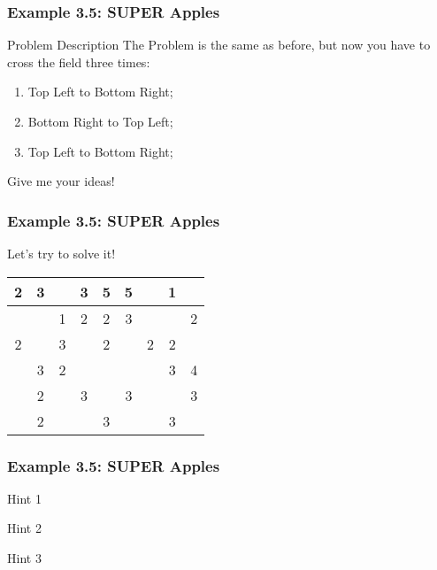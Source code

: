 \documentclass{beamer}
\begin{document}
\begin{frame}
  \frametitle{Example 3.5: SUPER Apples}
  \begin{block}{Problem Description}
    The Problem is the same as before, but now you have to cross the
    field three times:
    \begin{enumerate}
      \item Top Left to Bottom Right;
      \item Bottom Right to Top Left;
      \item Top Left to Bottom Right;
    \end{enumerate}
  \end{block}
  \medskip
  \begin{center}
    Give me your ideas!
  \end{center}
\end{frame}

\begin{frame}
  \frametitle{Example 3.5: SUPER Apples}
  \begin{block}{}
    Let's try to solve it!
  \end{block}
  \begin{center}
    \begin{tabular}{|c|c|c|c|c|c|c|c|c|}
      \hline
      2 & 3 & & 3 & 5 & 5 & & 1 & \\
      \hline
      & & 1 & 2 & 2 & 3 & & & 2 \\
      \hline
    2 & & 3 & & 2 & & 2 & 2 & \\
    \hline
    & 3 & 2 & & & & & 3 & 4 \\
    \hline
    & 2 & & 3 & & 3 & & & 3\\
    \hline
    & 2 & & & 3 & & & 3 & \\
    \hline      
    \end{tabular}
  \end{center}
\end{frame}

\begin{frame}
  \frametitle{Example 3.5: SUPER Apples}
  \begin{block}{Hint 1}
  \end{block}

  \begin{block}{Hint 2}
  \end{block}
  
  \begin{block}{Hint 3}
  \end{block}
\end{frame}
\end{document}
